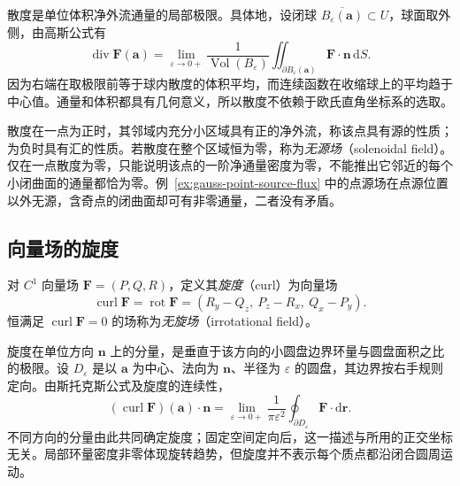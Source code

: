 散度是单位体积净外流通量的局部极限。具体地，设闭球 $\overline{B_\varepsilon(\boldsymbol a)}\subset U$，球面取外侧，由高斯公式有
\begin{equation}
\label{eq:divergence-local-flux}
    \operatorname{div}\boldsymbol F(\boldsymbol a)
    =\lim_{\varepsilon\to0+}
      \frac1{\operatorname{Vol}(B_\varepsilon)}
      \iint_{\partial B_\varepsilon(\boldsymbol a)}
      \boldsymbol F\cdot\boldsymbol n\,\mathrm dS.
\end{equation}
因为右端在取极限前等于球内散度的体积平均，而连续函数在收缩球上的平均趋于中心值。通量和体积都具有几何意义，所以散度不依赖于欧氏直角坐标系的选取。

散度在一点为正时，其邻域内充分小区域具有正的净外流，称该点具有源的性质；为负时具有汇的性质。若散度在整个区域恒为零，称为\emph{无源场}（solenoidal field）。仅在一点散度为零，只能说明该点的一阶净通量密度为零，不能推出它邻近的每个小闭曲面的通量都恰为零。例~\ref{ex:gauss-point-source-flux} 中的点源场在点源位置以外无源，含奇点的闭曲面却可有非零通量，二者没有矛盾。

\subsection{向量场的旋度}
\label{subsec:curl-of-vector-fields}

\begin{definition}
\label{def:vector-field-curl}
对 $C^1$ 向量场 $\boldsymbol F=(P,Q,R)$，定义其\emph{旋度}（curl）为向量场
\[
    \operatorname{curl}\boldsymbol F
    =\operatorname{rot}\boldsymbol F
    =(R_y-Q_z,\ P_z-R_x,\ Q_x-P_y).
\]
恒满足 $\operatorname{curl}\boldsymbol F=0$ 的场称为\emph{无旋场}（irrotational field）。
\end{definition}

旋度在单位方向 $\boldsymbol n$ 上的分量，是垂直于该方向的小圆盘边界环量与圆盘面积之比的极限。设 $D_\varepsilon$ 是以 $\boldsymbol a$ 为中心、法向为 $\boldsymbol n$、半径为 $\varepsilon$ 的圆盘，其边界按右手规则定向。由斯托克斯公式及旋度的连续性，
\begin{equation}
\label{eq:curl-local-circulation}
    (\operatorname{curl}\boldsymbol F)(\boldsymbol a)\cdot\boldsymbol n
    =\lim_{\varepsilon\to0+}
      \frac1{\pi\varepsilon^2}
      \oint_{\partial D_\varepsilon}\boldsymbol F\cdot\mathrm d\boldsymbol r.
\end{equation}
不同方向的分量由此共同确定旋度；固定空间定向后，这一描述与所用的正交坐标无关。局部环量密度非零体现旋转趋势，但旋度并不表示每个质点都沿闭合圆周运动。

